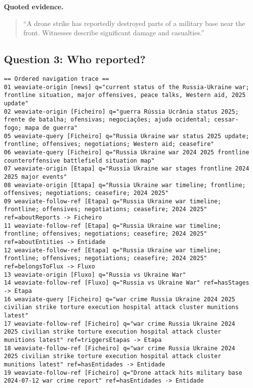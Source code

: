 \noindent\textbf{Quoted evidence.}
\begin{quote}
\enquote{A drone strike has reportedly destroyed parts of a military base near the front. Witnesses describe significant damage and casualties.}
\end{quote}

\subsection*{Question 3: Who reported?}
\begin{lstlisting}
== Ordered navigation trace ==
01 weaviate-origin [news] q="current status of the Russia-Ukraine war; frontline situation, major offensives, peace talks, Western aid, 2025 update"
02 weaviate-origin [Ficheiro] q="guerra Rússia Ucrânia status 2025; frente de batalha; ofensivas; negociações; ajuda ocidental; cessar-fogo; mapa de guerra"
05 weaviate-query [Ficheiro] q="Russia Ukraine war status 2025 update; frontline; offensives; negotiations; Western aid; ceasefire"
06 weaviate-query [Ficheiro] q="Russia Ukraine war 2024 2025 frontline counteroffensive battlefield situation map"
07 weaviate-origin [Etapa] q="Russia Ukraine war stages frontline 2024 2025 major events"
08 weaviate-origin [Etapa] q="Russia Ukraine war timeline; frontline; offensives; negotiations; ceasefire; 2024 2025"
09 weaviate-follow-ref [Etapa] q="Russia Ukraine war timeline; frontline; offensives; negotiations; ceasefire; 2024 2025" ref=aboutReports -> Ficheiro
11 weaviate-follow-ref [Etapa] q="Russia Ukraine war timeline; frontline; offensives; negotiations; ceasefire; 2024 2025" ref=aboutEntities -> Entidade
12 weaviate-follow-ref [Etapa] q="Russia Ukraine war timeline; frontline; offensives; negotiations; ceasefire; 2024 2025" ref=belongsToFlux -> Fluxo
13 weaviate-origin [Fluxo] q="Russia vs Ukraine War"
14 weaviate-follow-ref [Fluxo] q="Russia vs Ukraine War" ref=hasStages -> Etapa
16 weaviate-query [Ficheiro] q="war crime Russia Ukraine 2024 2025 civilian strike torture execution hospital attack cluster munitions latest"
17 weaviate-follow-ref [Ficheiro] q="war crime Russia Ukraine 2024 2025 civilian strike torture execution hospital attack cluster munitions latest" ref=triggersEtapas -> Etapa
18 weaviate-follow-ref [Ficheiro] q="war crime Russia Ukraine 2024 2025 civilian strike torture execution hospital attack cluster munitions latest" ref=hasEntidades -> Entidade
19 weaviate-follow-ref [Ficheiro] q="Drone attack hits military base 2024-07-12 war crime report" ref=hasEntidades -> Entidade
\end{lstlisting}

